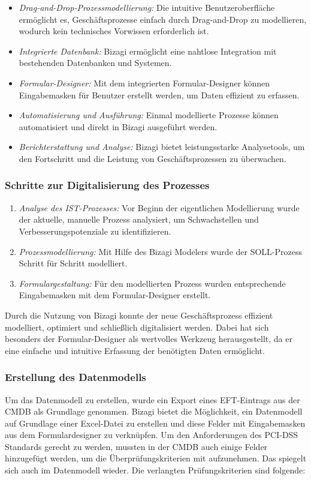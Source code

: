 \documentclass[12pt, a4paper]{article}
\begin{document}
\begin{itemize}
\item \textit{Drag-and-Drop-Prozessmodellierung:} Die intuitive Benutzeroberfläche ermöglicht es, Geschäftsprozesse einfach durch Drag-and-Drop zu modellieren, 
wodurch kein technisches Vorwissen erforderlich ist.
\item \textit{Integrierte Datenbank:} Bizagi ermöglicht eine nahtlose Integration mit bestehenden Datenbanken und Systemen.
\item \textit{Formular-Designer:} Mit dem integrierten Formular-Designer können Eingabemasken für Benutzer erstellt werden, um Daten effizient zu erfassen.
\item \textit{Automatisierung und Ausführung:} Einmal modellierte Prozesse können automatisiert und direkt in Bizagi ausgeführt werden.
\item \textit{Berichterstattung und Analyse:} Bizagi bietet leistungsstarke Analysetools, um den Fortschritt und die Leistung von Geschäftsprozessen zu überwachen.
\end{itemize}

\subsubsection{Schritte zur Digitalisierung des Prozesses}

\begin{enumerate}
\item \textit{Analyse des IST-Prozesses:} Vor Beginn der eigentlichen Modellierung wurde der aktuelle, manuelle Prozess analysiert, um Schwachstellen und 
Verbesserungspotenziale zu identifizieren.
\item \textit{Prozessmodellierung:} Mit Hilfe des Bizagi Modelers wurde der SOLL-Prozess Schritt für Schritt modelliert.
\item \textit{Formulargestaltung:} Für den modellierten Prozess wurden entsprechende Eingabemasken mit dem Formular-Designer erstellt.
\end{enumerate}


Durch die Nutzung von Bizagi konnte der neue Geschäftsprozess effizient modelliert, optimiert und schließlich digitalisiert werden. Dabei hat sich besonders der 
Formular-Designer als wertvolles Werkzeug herausgestellt, da er eine einfache und intuitive Erfassung der benötigten Daten ermöglicht.

\subsubsection{Erstellung des Datenmodells}
Um das Datenmodell zu erstellen, wurde ein Export eines EFT-Eintrags aus der CMDB als Grundlage genommen. Bizagi bietet die Möglichkeit, ein Datenmodell auf Grundlage einer 
Excel-Datei zu erstellen und diese Felder mit Eingabemasken aus dem Formulardesigner zu verknüpfen. Um den Anforderungen des PCI-DSS Standards gerecht zu werden, mussten in der
CMDB auch einige Felder hinzugefügt werden, um die Überprüfungskriterien mit aufzunehmen. Das spiegelt sich auch im Datenmodell wieder.
Die verlangten Prüfungskriterien sind folgende:
\end{document}
